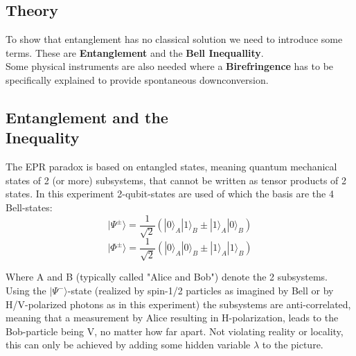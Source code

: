 \documentclass[12pt,a4paper]{article}
\begin{document}
\begin{multicols}{2}

\section{Theory}
\label{theory}
To show that entanglement has no classical solution we need to introduce some terms. These are \textbf{Entanglement} and the \textbf{Bell Inequallity}. \\
Some physical instruments are also needed where a \textbf{Birefringence} has to be specifically explained to provide spontaneous downconversion. \\

\subsection{Entanglement and the \\ Inequality}
The EPR paradox is based on entangled states, meaning quantum mechanical states of 2 (or more) subsystems, that cannot be written as tensor products of 2 states. In this experiment 2-qubit-states are used of which the basis are the 4 Bell-states:
$$|\Psi^{\pm}\rangle = \frac{1}{\sqrt{2}}(|0\rangle_A|1\rangle_B \pm |1\rangle_A|0\rangle_B)$$
$$|\Phi^{\pm}\rangle = \frac{1}{\sqrt{2}}(|0\rangle_A|0\rangle_B \pm |1\rangle_A|1\rangle_B)$$

\noindent Where A and B (typically called "Alice and Bob") denote the 2 subsystems.\\
Using the $|\Psi^{-}\rangle$-state (realized by spin-1/2 particles as imagined by Bell or by H/V-polarized photons as in this experiment) the subsystems are anti-correlated, meaning that a measurement by Alice resulting in H-polarization, leads to the Bob-particle being V, no matter how far apart. Not violating reality or locality, this can only be achieved by adding some hidden variable $\lambda$ to the picture.\\






\end{multicols}
\end{document}
